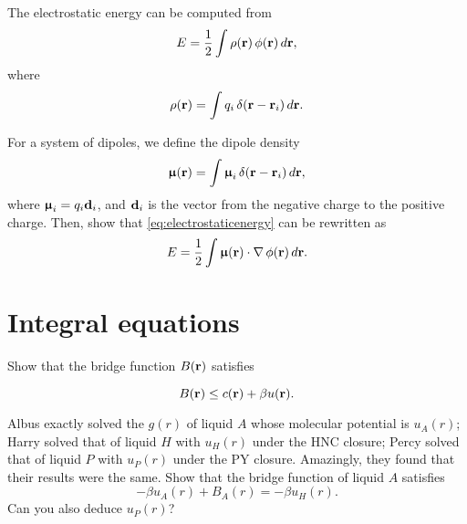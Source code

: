 \documentclass[12pt]{book}
\begin{document}

The electrostatic energy can be computed from
\begin{equation}
  E = \frac{1}{2} \int \rho(\boldsymbol{\mathbf{r}}) \, \phi(\boldsymbol{\mathbf{r}}) \, d\boldsymbol{\mathbf{r}},
  \label{eq:electrostaticenergy}
\end{equation}
where
\[
  \rho(\boldsymbol{\mathbf{r}}) = \int q_i \, \delta(\boldsymbol{\mathbf{r}} - \boldsymbol{\mathbf{r}}_i) \, d\boldsymbol{\mathbf{r}}.
\]

For a system of dipoles, we define the dipole density
\[
  \boldsymbol{\mathbf{\upmu}}(\boldsymbol{\mathbf{r}}) = \int \boldsymbol{\mathbf{\upmu}}_i \, \delta(\boldsymbol{\mathbf{r}} - \boldsymbol{\mathbf{r}}_i) \, d\boldsymbol{\mathbf{r}},
\]
where $\boldsymbol{\mathbf{\upmu}}_i = q_i \boldsymbol{\mathbf{d}}_i$,
and $\boldsymbol{\mathbf{d}}_i$ is the vector from the negative charge to the positive charge.
%
Then, show that \eqref{eq:electrostaticenergy} can be rewritten as
\[
  E = \frac{1}{2} \int \boldsymbol{\mathbf{\upmu}}(\boldsymbol{\mathbf{r}}) \cdot \nabla \, \phi(\boldsymbol{\mathbf{r}}) \, d\boldsymbol{\mathbf{r}}.
\]







\chapter{Integral equations}


Show that the bridge function $B(\boldsymbol{\mathbf{r}})$ satisfies\cite{kast2012}

\begin{equation}
  B(\boldsymbol{\mathbf{r}}) \le c(\boldsymbol{\mathbf{r}}) + \beta u(\boldsymbol{\mathbf{r}}).
\end{equation}





Albus exactly solved the $g(r)$ of liquid $A$ whose molecular potential is $u_A(r)$;
Harry solved that of liquid $H$ with $u_H(r)$ under the HNC closure;
Percy solved that of liquid $P$ with $u_P(r)$ under the PY closure.
Amazingly, they found that their results were the same.
Show that the bridge function of liquid $A$ satisfies
\begin{equation}
  -\beta u_A(r) + B_A(r) = -\beta u_H(r).
\end{equation}
Can you also deduce $u_P(r)$?
\end{document}
